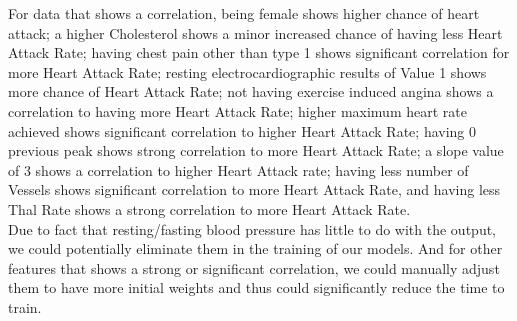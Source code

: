 \documentclass[11pt, oneside]{article}
\begin{document}
For data that shows a correlation, being female shows higher chance of heart attack; a higher Cholesterol shows a minor increased chance of having less Heart Attack Rate; having chest pain other than type 1 shows significant correlation for more Heart Attack Rate; resting electrocardiographic results of Value 1 shows more chance of Heart Attack Rate; not having exercise induced angina shows a correlation to having more Heart Attack Rate; higher maximum heart rate achieved shows significant correlation to higher Heart Attack Rate; having 0 previous peak shows strong correlation to more Heart Attack Rate; a slope value of 3 shows a correlation to higher Heart Attack rate; having less number of Vessels shows significant correlation to more Heart Attack Rate, and having less Thal Rate shows a strong correlation to more Heart Attack Rate.\\

Due to fact that resting/fasting blood pressure has little to do with the output, we could potentially eliminate them in the training of our models. And for other features that shows a strong or significant correlation, we could manually adjust them to have more initial weights and thus could significantly reduce the time to train. 
\end{document}
